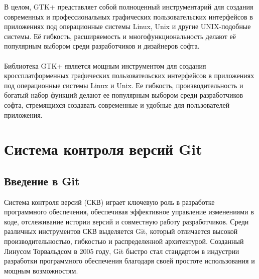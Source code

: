 В целом, GTK+ представляет собой полноценный инструментарий для создания современных и профессиональных графических пользовательских интерфейсов в приложениях под операционные системы Linux, Unix и другие UNIX-подобные системы. Её гибкость, расширяемость и многофункциональность делают её популярным выбором среди разработчиков и дизайнеров софта.
\\
\\
Библиотека GTK+ является мощным инструментом для создания кроссплатформенных графических пользовательских интерфейсов в приложениях под операционные системы Linux и Unix. Ее гибкость, производительность и богатый набор функций делают ее популярным выбором среди разработчиков софта, стремящихся создавать современные и удобные для пользователей приложения.

\section{\label{sec:ch01/sec03}Система контроля версий Git}

\subsection{\label{subsec:ch01/sec01/sub01}Введение в Git}
Система контроля версий (СКВ) играет ключевую роль в разработке программного обеспечения, обеспечивая эффективное управление изменениями в коде, отслеживание истории версий и совместную работу разработчиков. Среди различных инструментов СКВ выделяется Git, который отличается высокой производительностью, гибкостью и распределенной архитектурой. Созданный Линусом Торвальдсом в 2005 году, Git быстро стал стандартом в индустрии разработки программного обеспечения благодаря своей простоте использования и мощным возможностям.


